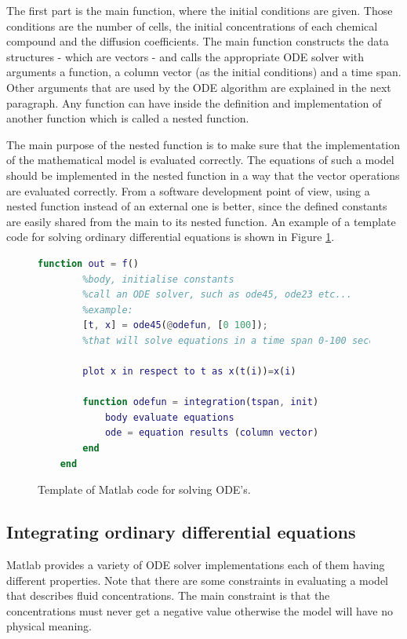 The first part is the main function, where the initial conditions are given. Those conditions are the number of cells, the initial concentrations of each chemical compound and the diffusion coefficients. The main function constructs the data structures - which are vectors - and calls the appropriate ODE solver with arguments a function, a column vector (as the initial conditions) and a time span. Other arguments that are used by the ODE algorithm are explained in the next paragraph. Any function can have inside the definition and implementation of another function which is called a nested function.
    
The main purpose of the nested function is to make sure that the implementation of the mathematical model is evaluated correctly. The equations of such a model should be implemented in the nested function in a way that the vector operations are evaluated correctly. From a software development point of view, using a nested function instead of an external one is better, since the defined constants are easily shared from the main to its nested function. An example of a template code for solving ordinary differential equations is shown in Figure \ref{templateCode}.
\begin{figure}[h!]
\begin{center}
    \begin{lstlisting}[language=matlab]
    function out = f()
        %body, initialise constants
        %call an ODE solver, such as ode45, ode23 etc...
        %example:
        [t, x] = ode45(@odefun, [0 100]); 
        %that will solve equations in a time span 0-100 seconds        
        
        plot x in respect to t as x(t(i))=x(i)
            
        function odefun = integration(tspan, init)
            body evaluate equations 
            ode = equation results (column vector)
        end
    end 
    \end{lstlisting}
\caption{Template of Matlab code for solving ODE's.}
\label{templateCode}
\end{center}
\end{figure}
	\subsection{Integrating ordinary differential equations}
    Matlab provides a variety of ODE solver implementations each of them having different properties. Note that there are some constraints in evaluating a model that describes fluid concentrations. The main constraint is that the concentrations must never get a negative value otherwise the model will have no physical meaning.

